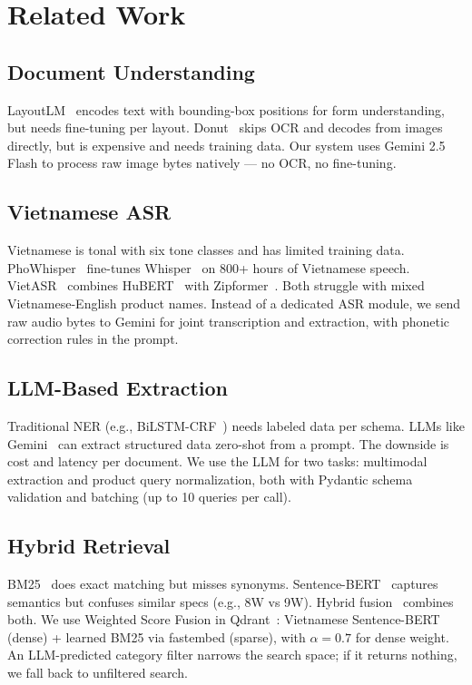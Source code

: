 \section{Related Work}

\subsection{Document Understanding}

LayoutLM~\cite{xu2020layoutlm} encodes text with bounding-box positions for form understanding, but needs fine-tuning per layout. Donut~\cite{kim2022ocr} skips OCR and decodes from images directly, but is expensive and needs training data. Our system uses Gemini 2.5 Flash to process raw image bytes natively — no OCR, no fine-tuning.

\subsection{Vietnamese ASR}

Vietnamese is tonal with six tone classes and has limited training data. PhoWhisper~\cite{le2024phowhisper} fine-tunes Whisper~\cite{radford2023whisper} on 800+ hours of Vietnamese speech. VietASR~\cite{zhuo2025vietasr} combines HuBERT~\cite{hsu2021hubert} with Zipformer~\cite{yao2024zipformer}. Both struggle with mixed Vietnamese-English product names. Instead of a dedicated ASR module, we send raw audio bytes to Gemini for joint transcription and extraction, with phonetic correction rules in the prompt.

\subsection{LLM-Based Extraction}

Traditional NER (e.g., BiLSTM-CRF~\cite{lample2016neural}) needs labeled data per schema. LLMs like Gemini~\cite{reid2024gemini} can extract structured data zero-shot from a prompt. The downside is cost and latency per document. We use the LLM for two tasks: multimodal extraction and product query normalization, both with Pydantic schema validation and batching (up to 10 queries per call).

\subsection{Hybrid Retrieval}

BM25~\cite{robertson2009probabilistic} does exact matching but misses synonyms. Sentence-BERT~\cite{reimers2019sentence} captures semantics but confuses similar specs (e.g., 8W vs 9W). Hybrid fusion~\cite{cormack2009reciprocal} combines both. We use Weighted Score Fusion in Qdrant~\cite{qdrant}: Vietnamese Sentence-BERT (dense) + learned BM25 via fastembed (sparse), with $\alpha = 0.7$ for dense weight. An LLM-predicted category filter narrows the search space; if it returns nothing, we fall back to unfiltered search.